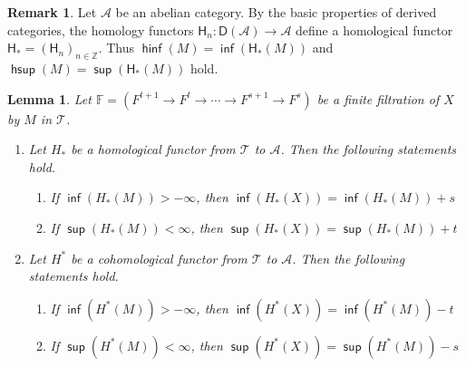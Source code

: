 \documentclass[10pt, a4paper,reqno]{amsart}
\newtheorem{lem}[lem]{Lemma}
\theoremstyle{definition}
\newtheorem{rmk}[rmk]{Remark}
\theoremstyle{remark}
\numberwithin{equation}{thm}
\def\FF{\mathbb{F}}
\def\ZZ{\mathbb{Z}}
\def\cA{\mathcal{A}}
\def\cT{\mathcal{T}}
\def\sH{\mathsf{H}}
\def\D{\mathsf{D}}
\def\sup{\operatorname{\mathsf{sup}}}
\def\hsup{\operatorname{\mathsf{hsup}}}
\def\inf{\operatorname{\mathsf{inf}}}
\def\hinf{\operatorname{\mathsf{hinf}}}
\begin{document}
\begin{rmk}
Let $\cA$ be an abelian category.
By the basic properties of derived categories, the homology functors $\sH_n: \D(\cA) \to \cA$ define a homological functor $\sH_* = (\sH_n)_{n \in \ZZ}$.
Thus $\hinf(M) = \inf(\sH_*(M))$ and $\hsup(M) = \sup(\sH_*(M))$ hold.
\end{rmk}


\begin{lem}\label{bound}
Let $\FF = (F^{t+1} \to F^{t} \to \cdots \to F^{s+1} \to F^s)$ be a finite filtration of $X$ by $M$ in $\cT$.
\begin{enumerate}[\rm(1)]
\item	
Let $H_*$ be a homological functor from $\cT$ to $\cA$.
Then the following statements hold.
\begin{enumerate}[\rm(i)]
\item
If $\inf(H_*(M))> -\infty$, then $\inf(H_*(X)) = \inf(H_*(M)) + s$
\item
If $\sup(H_*(M))< \infty$, then $\sup(H_*(X)) = \sup(H_*(M)) + t$
\end{enumerate}

\item	
Let $H^*$ be a cohomological functor from $\cT$ to $\cA$.
Then the following statements hold.
\begin{enumerate}[\rm(i)]
\item
If $\inf(H^*(M))> -\infty$, then $\inf(H^*(X)) = \inf(H^*(M)) - t$
\item
If $\sup(H^*(M))< \infty$, then $\sup(H^*(X)) = \sup(H^*(M)) - s$
\end{enumerate}
\end{enumerate}
\end{lem}
\end{document}
